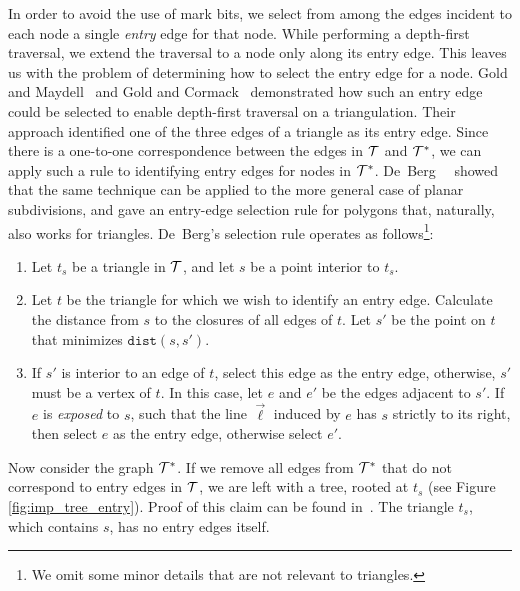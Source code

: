   In order to avoid the use of mark bits, we select from among the edges incident 
  to each node a single \emph{entry} edge for that node. 
  While performing a depth-first traversal, we extend the traversal 
  to a node only along its entry edge.
  This leaves us with the problem of determining how to select the entry edge
  for a node.  
  Gold and Maydell~\cite{gold_maydell_1978} and Gold and 
  Cormack~\cite{gold_cormack86} demonstrated how such an entry edge could 
  be selected to enable depth-first traversal on a triangulation.
  Their approach identified one of the three edges of a triangle as its 
  entry edge.
  Since there is a one-to-one correspondence between the edges in $\mathcal{T}$ 
  and $\mathcal{T}^*$, we can apply such a rule to identifying entry
  edges for nodes in $\mathcal{T}^*$. 
  De~Berg~\etal~\cite{deberg_et_al_1997} showed that the same technique can 
  be applied to the more general case of planar subdivisions, and 
  gave an entry-edge selection rule for polygons that, naturally, also works 
  for triangles.
  De~Berg's selection rule operates as follows\footnote{We 
  omit some minor details that are not relevant to triangles.}:

  \begin{enumerate}
  \item Let $t_s$ be a triangle in $\mathcal{T}$, and let $s$ be a point interior
  to $t_s$.
  \item Let $t$ be the triangle for which we wish to identify an entry edge.
  Calculate the distance from $s$ to the closures of all edges of $t$.
  Let $s'$ be the point on $t$ that minimizes $\texttt{dist}(s,s')$. 
  \item If $s'$ is interior to an edge of $t$, select this edge as the
  entry edge, otherwise, $s'$ must be a vertex of $t$. 
  In this case, let $e$ and $e'$ be the edges adjacent to $s'$. 
  If $e$ is \emph{exposed} to $s$, such that the line $\vec{\ell}$ induced by 
  $e$ has $s$ strictly to its right, then select $e$ as the entry edge, otherwise
  select $e'$. 
  \end{enumerate}

  Now consider the graph $\mathcal{T}^*$.
  If we remove all edges from $\mathcal{T}^*$ that
  do not correspond to entry edges in $\mathcal{T}$, we are left with a tree, 
  rooted at $t_s$ (see Figure \ref{fig:imp_tree_entry}).
  Proof of this claim can be found in~\cite{deberg_et_al_1997}.
  The triangle $t_s$, which contains $s$, has no entry edges itself.

